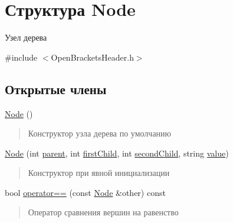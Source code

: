 \hypertarget{struct_node}{}\section{Структура Node}
\label{struct_node}


Узел дерева  




{\ttfamily \#include $<$Open\+Brackets\+Header.\+h$>$}

\subsection*{Открытые члены}
\begin{DoxyCompactItemize}
\item 
\mbox{\hyperlink{struct_node_ad7a34779cad45d997bfd6d3d8043c75f}{Node}} ()
\begin{DoxyCompactList}\small\item\em \begin{quote}
Конструктор узла дерева по умолчанию \end{quote}
\end{DoxyCompactList}\item 
\mbox{\hyperlink{struct_node_a314c4afdba9c757f65d45f236a9ce1fe}{Node}} (int \mbox{\hyperlink{struct_node_a122e2ce83616f32faa022223be3f50ab}{parent}}, int \mbox{\hyperlink{struct_node_a6ed10d6fbe8f8c2f08d18dd10a89f872}{first\+Child}}, int \mbox{\hyperlink{struct_node_a5ae4e8db98829aa5a678560df5ddd7ee}{second\+Child}}, string \mbox{\hyperlink{struct_node_afbfe6bbcc5e6d53bb23ff4c29c178596}{value}})
\begin{DoxyCompactList}\small\item\em \begin{quote}
Конструктор при явной инициализации \end{quote}
\end{DoxyCompactList}\item 
bool \mbox{\hyperlink{struct_node_a0e28753e22ef956f881210795f1c102f}{operator==}} (const \mbox{\hyperlink{struct_node}{Node}} \&other) const
\begin{DoxyCompactList}\small\item\em \begin{quote}
Оператор сравнения вершин на равенство \end{quote}
\end{DoxyCompactList}\end{DoxyCompactItemize}
